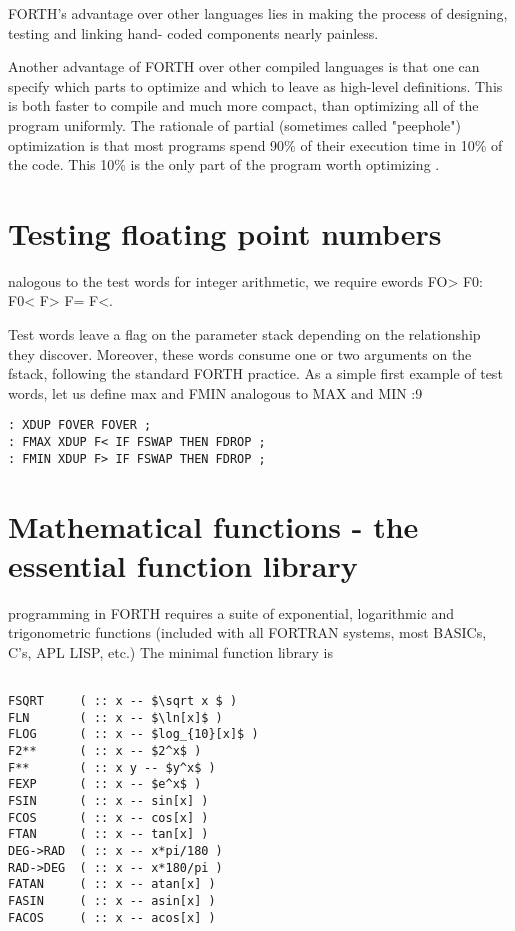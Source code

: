 FORTH’s advantage over other languages lies in making the 
process of designing, testing and linking hand- coded components
nearly painless.

Another advantage of FORTH over other compiled languages is
that one can specify which parts to optimize and which to leave
as high-level definitions. This is both faster to compile and much
more compact, than optimizing all of the program uniformly. The
rationale of partial (sometimes called "peephole") optimization
is that most programs spend 90\% of their execution time in 10\%
of the code. This 10\% is the only part of the program worth
optimizing .

\section{Testing floating point numbers}

 nalogous to the test words for integer arithmetic, we require
ewords FO> F0: F0< F> F= F<.

Test words leave a ﬂag on the parameter stack depending on the
relationship they discover. Moreover, these words consume one
or two arguments on the fstack, following the standard FORTH
practice. As a simple first example of test words, let us define
max and FMIN analogous to MAX and MIN :9
\begin{verbatim}
: XDUP FOVER FOVER ;
: FMAX XDUP F< IF FSWAP THEN FDROP ;
: FMIN XDUP F> IF FSWAP THEN FDROP ;
\end{verbatim}

\section{Mathematical functions - the essential function library}

 programming in FORTH requires a suite of exponential,
logarithmic and trigonometric functions (included with all
FORTRAN systems, most BASICs, C’s, APL LISP, etc.) The
minimal function library is

\begin{verbatim}

FSQRT     ( :: x -- $\sqrt x $ )
FLN       ( :: x -- $\ln[x]$ )
FLOG      ( :: x -- $log_{10}[x]$ )
F2**      ( :: x -- $2^x$ )
F**       ( :: x y -- $y^x$ )
FEXP      ( :: x -- $e^x$ )
FSIN      ( :: x -- sin[x] )
FCOS      ( :: x -- cos[x] )
FTAN      ( :: x -- tan[x] )
DEG->RAD  ( :: x -- x*pi/180 )
RAD->DEG  ( :: x -- x*180/pi )
FATAN     ( :: x -- atan[x] )
FASIN     ( :: x -- asin[x] )
FACOS     ( :: x -- acos[x] )

\end{verbatim}


